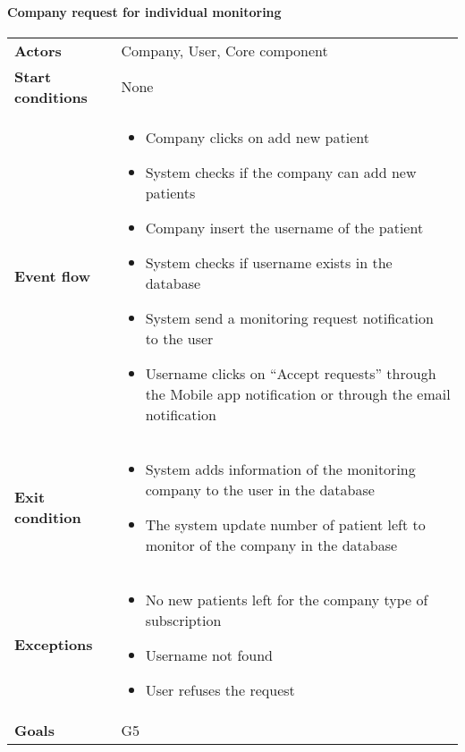 \paragraph{Company request for individual monitoring}
\begin{center}
\begin{table}[H]
\centering
\begin{tabular}{l|l}
\textbf{Actors} & Company, User, Core component \\
\textbf{Start conditions} & None \\
\textbf{Event flow}  & 

\begin{minipage}[t]{0.7\textwidth}
    \begin{itemize}
        \item Company clicks on add new patient 
\item System checks if the company can add new patients 
\item Company insert the username of the patient 
\item System checks if username exists in the database
\item System send a monitoring request notification to the user 
\item Username clicks on “Accept requests” through the Mobile app notification or through the email notification 
    \end{itemize}
    
\end{minipage}

\\
\textbf{Exit condition} & 
\begin{minipage}[t]{0.7\textwidth}
    \begin{itemize}
       \item System adds information of the monitoring company to the user in the database
\item The system update number of patient left to monitor of the company in the database

    \end{itemize}
    
\end{minipage}
\\
\textbf{Exceptions} & 

\begin{minipage}[t]{0.7\textwidth}
    \begin{itemize}
       \item No new patients left for the company type of subscription
\item Username not found
\item User refuses the request

    \end{itemize}
    
\end{minipage}
\\
\textbf{Goals} & G5 
\end{tabular}

\end{table}
\end{center}
